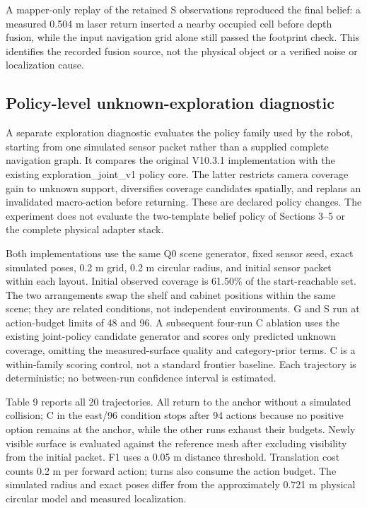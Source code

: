 \documentclass[11pt,a4paper]{article}
\begin{document}
A mapper-only replay of the retained S observations reproduced the final belief: a measured 0.504 m laser return inserted a nearby occupied cell before depth fusion, while the input navigation grid alone still passed the footprint check. This identifies the recorded fusion source, not the physical object or a verified noise or localization cause.

\subsection{Policy-level unknown-exploration diagnostic}\label{unknown-exploration-diagnostic}

A separate exploration diagnostic evaluates the policy family used by
the robot, starting from one simulated sensor packet rather than a
supplied complete navigation graph. It compares the original V10.3.1
implementation with the existing exploration\_joint\_v1 policy core. The
latter restricts camera coverage gain to unknown support, diversifies
coverage candidates spatially, and replans an invalidated macro-action
before returning. These are declared policy changes. The experiment does
not evaluate the two-template belief policy of Sections 3--5 or the
complete physical adapter stack.


Both implementations use the same Q0 scene generator, fixed sensor seed,
exact simulated poses, 0.2 m grid, 0.2 m circular radius, and initial
sensor packet within each layout. Initial observed coverage is 61.50\%
of the start-reachable set. The two arrangements swap the shelf and
cabinet positions within the same scene; they are related conditions,
not independent environments. G and S run at action-budget limits of 48
and 96. A subsequent four-run C ablation uses the existing joint-policy
candidate generator and scores only predicted unknown coverage, omitting
the measured-surface quality and category-prior terms. C is a
within-family scoring control, not a standard frontier baseline. Each
trajectory is deterministic; no between-run confidence interval is
estimated.


Table 9 reports all 20 trajectories. All return to the anchor without a
simulated collision; C in the east/96 condition stops after 94 actions
because no positive option remains at the anchor, while the other runs
exhaust their budgets. Newly visible surface is evaluated against the
reference mesh after excluding visibility from the initial packet. F1
uses a 0.05 m distance threshold. Translation cost counts 0.2 m per
forward action; turns also consume the action budget. The simulated
radius and exact poses differ from the approximately 0.721 m physical
circular model and measured localization.
\end{document}
